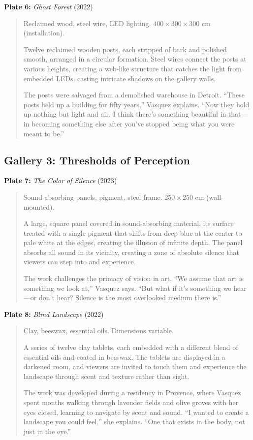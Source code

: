 \documentclass[
    language=english,
    doctype=art-catalogue,
    institution=none,
]{../../omnilatex}
\begin{document}
\textbf{Plate 6:} \textit{Ghost Forest} (2022)
\begin{quote}
Reclaimed wood, steel wire, LED lighting.
$400 \times 300 \times 300$ cm (installation).

Twelve reclaimed wooden posts, each stripped of bark and polished smooth, arranged in a circular formation. Steel wires connect the posts at various heights, creating a web-like structure that catches the light from embedded LEDs, casting intricate shadows on the gallery walls.

The posts were salvaged from a demolished warehouse in Detroit. ``These posts held up a building for fifty years,'' Vasquez explains. ``Now they hold up nothing but light and air. I think there's something beautiful in that---in becoming something else after you've stopped being what you were meant to be.''
\end{quote}

\subsection{Gallery 3: Thresholds of Perception}

\textbf{Plate 7:} \textit{The Color of Silence} (2023)
\begin{quote}
Sound-absorbing panels, pigment, steel frame.
$250 \times 250$ cm (wall-mounted).

A large, square panel covered in sound-absorbing material, its surface treated with a single pigment that shifts from deep blue at the center to pale white at the edges, creating the illusion of infinite depth. The panel absorbs all sound in its vicinity, creating a zone of absolute silence that viewers can step into and experience.

The work challenges the primacy of vision in art. ``We assume that art is something we look at,'' Vasquez says. ``But what if it's something we hear---or don't hear? Silence is the most overlooked medium there is.''
\end{quote}

\textbf{Plate 8:} \textit{Blind Landscape} (2022)
\begin{quote}
Clay, beeswax, essential oils.
Dimensions variable.

A series of twelve clay tablets, each embedded with a different blend of essential oils and coated in beeswax. The tablets are displayed in a darkened room, and viewers are invited to touch them and experience the landscape through scent and texture rather than sight.

The work was developed during a residency in Provence, where Vasquez spent months walking through lavender fields and olive groves with her eyes closed, learning to navigate by scent and sound. ``I wanted to create a landscape you could feel,'' she explains. ``One that exists in the body, not just in the eye.''
\end{quote}
\end{document}
